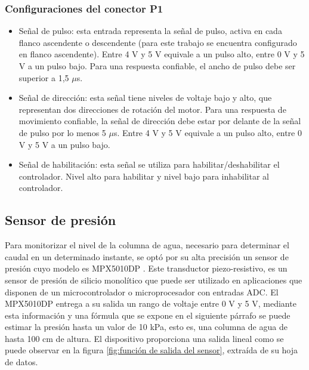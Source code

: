 \subsubsection{Configuraciones del conector P1}
\begin{itemize}

\item Señal de pulso: esta entrada representa la señal de pulso, activa en cada flanco ascendente o descendente (para este trabajo se encuentra configurado en flanco ascendente). Entre 4 V y 5 V equivale a un pulso alto, entre 0 V y 5 V a un pulso bajo. Para una respuesta confiable, el ancho de pulso debe ser superior a 1,5 $\mu$s. 

\item Señal de dirección: esta señal tiene niveles de voltaje bajo y alto, que representan dos direcciones de rotación del motor. Para una respuesta de movimiento confiable, la señal de dirección debe estar por delante de la señal de pulso por lo menos 5 $\mu$s. Entre 4 V y 5 V equivale a un pulso alto, entre 0 V y 5 V a un pulso bajo.

\item Señal de habilitación: esta señal se utiliza para habilitar/deshabilitar el controlador. Nivel alto para habilitar y nivel bajo para inhabilitar al controlador.

\end{itemize}
\subsection{Sensor de presión}
Para monitorizar el nivel de la columna de agua, necesario para determinar el caudal en un determinado instante, se optó por su alta precisión un sensor de presión cuyo modelo es MPX5010DP \citep{SENSORPRESION}. Este transductor piezo-resistivo, es un sensor de presión de silicio monolítico que puede ser utilizado en aplicaciones que disponen de un microcontrolador o microprocesador con entradas ADC.
El MPX5010DP entrega a su salida un rango de voltaje entre 0 V y 5 V, mediante esta información y una fórmula que se expone en el siguiente párrafo se puede estimar la presión hasta un valor de 10 kPa, esto es, una columna de agua de hasta 100 cm de altura.
El dispositivo proporciona una salida lineal como se puede observar en la figura \ref{fig:función de salida del sensor}, extraída de su hoja de datos.

